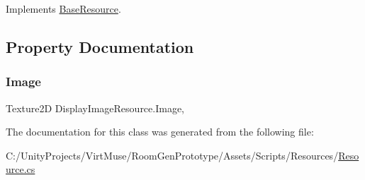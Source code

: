 Implements \mbox{\hyperlink{class_base_resource_a2d832c8042114da9e3f6240651d59703}{Base\+Resource}}.



\subsection{Property Documentation}
\mbox{\label{class_display_image_resource_a6268f6612b7c533eafc2b6c8f91c2925}} 
\subsubsection{\texorpdfstring{Image}{Image}}
{\footnotesize\ttfamily Texture2D Display\+Image\+Resource.\+Image\hspace{0.3cm}{\ttfamily [get]}, {\ttfamily [set]}}



The documentation for this class was generated from the following file\+:\begin{DoxyCompactItemize}
\item 
C\+:/\+Unity\+Projects/\+Virt\+Muse/\+Room\+Gen\+Prototype/\+Assets/\+Scripts/\+Resources/\mbox{\hyperlink{_resource_8cs}{Resource.\+cs}}\end{DoxyCompactItemize}
